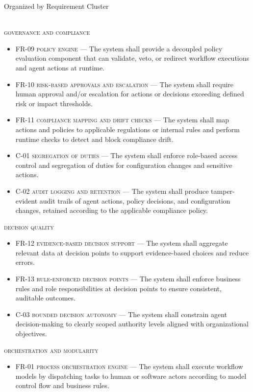 \noindent Organized by Requirement Cluster \\ \\
\begin{footnotesize}
  \textsc{governance and compliance}
    \begin{itemize}
      \item \textsc{FR-09 policy engine} --- The system shall provide a decoupled policy evaluation component that can validate, veto, or redirect workflow executions and agent actions at runtime.
      \item \textsc{FR-10 risk-based approvals and escalation} --- The system shall require human approval and/or escalation for actions or decisions exceeding defined risk or impact thresholds.
      \item \textsc{FR-11 compliance mapping and drift checks} --- The system shall map actions and policies to applicable regulations or internal rules and perform runtime checks to detect and block compliance drift.
      \item \textsc{C-01 segregation of duties} --- The system shall enforce role-based access control and segregation of duties for configuration changes and sensitive actions.
      \item \textsc{C-02 audit logging and retention} --- The system shall produce tamper-evident audit trails of agent actions, policy decisions, and configuration changes, retained according to the applicable compliance policy.
    \end{itemize}
  \textsc{decision quality}
    \begin{itemize}
      \item \textsc{FR-12 evidence-based decision support} --- The system shall aggregate relevant data at decision points to support evidence-based choices and reduce errors.
      \item \textsc{FR-13 rule-enforced decision points} --- The system shall enforce business rules and role responsibilities at decision points to ensure consistent, auditable outcomes.
      \item \textsc{C-03 bounded decision autonomy} --- The system shall constrain agent decision-making to clearly scoped authority levels aligned with organizational objectives.
    \end{itemize}
  \textsc{orchestration and modularity}
    \begin{itemize}
      \item \textsc{FR-01 process orchestration engine} --- The system shall execute workflow models by dispatching tasks to human or software actors according to model control flow and business rules.

\end{itemize}
\end{footnotesize}
